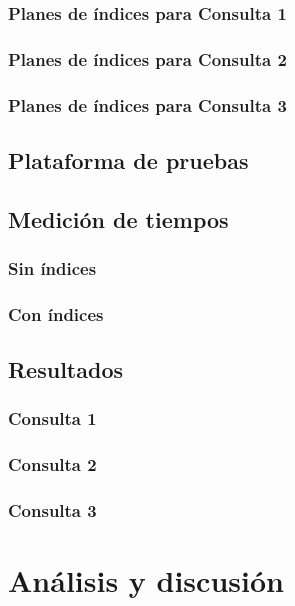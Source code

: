 \subsubsection{Planes de índices para Consulta 1}

\subsubsection{Planes de índices para Consulta 2}

\subsubsection{Planes de índices para Consulta 3}


\subsection{Plataforma de pruebas}

\subsection{Medición de tiempos}
\subsubsection{Sin índices}
\subsubsection{Con índices}

\subsection{Resultados}
\subsubsection{Consulta 1}
\subsubsection{Consulta 2}
\subsubsection{Consulta 3}

\section{Análisis y discusión}